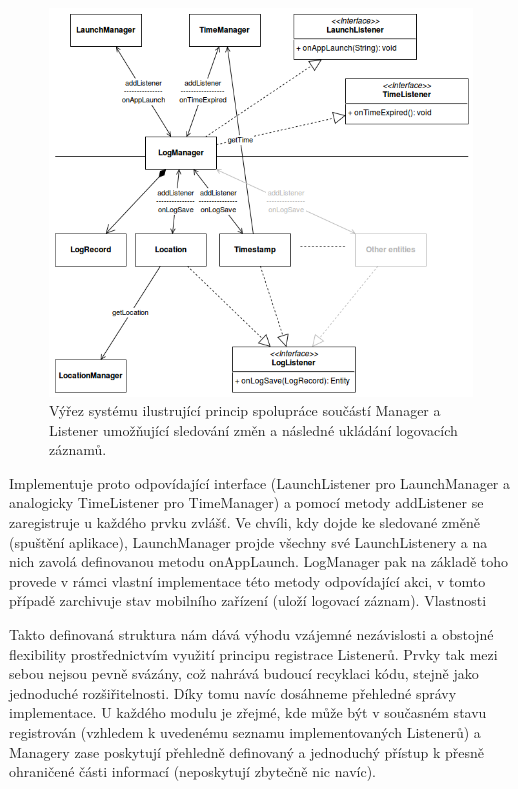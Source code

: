 \documentclass[thesis=M,czech]{FITthesis}[2012/06/26]
\begin{document}
\begin{figure}\centering
	\includegraphics[width=1\textwidth]{figures/manager_listener}
	\caption{Výřez systému ilustrující princip spolupráce součástí Manager a Listener umožňující sledování změn a následné ukládání logovacích záznamů.}
	\label{fig:manager_listener}
\end{figure}

Implementuje proto odpovídající interface (LaunchListener pro LaunchManager a analogicky TimeListener pro TimeManager) a pomocí metody addListener se zaregistruje u každého prvku zvlášť. Ve chvíli, kdy dojde ke sledované změně (spuštění aplikace), LaunchManager projde všechny své LaunchListenery a na nich zavolá definovanou metodu onAppLaunch. LogManager pak na základě toho provede v rámci vlastní implementace této metody odpovídající akci, v tomto případě zarchivuje stav mobilního zařízení (uloží logovací záznam).
Vlastnosti

Takto definovaná struktura nám dává výhodu vzájemné nezávislosti a obstojné flexibility prostřednictvím využití principu registrace Listenerů. Prvky tak mezi sebou nejsou pevně svázány, což nahrává budoucí recyklaci kódu, stejně jako jednoduché rozšiřitelnosti. Díky tomu navíc dosáhneme přehledné správy implementace. U každého modulu je zřejmé, kde může být v současném stavu registrován (vzhledem k uvedenému seznamu implementovaných Listenerů) a Managery zase poskytují přehledně definovaný a jednoduchý přístup k přesně ohraničené části informací (neposkytují zbytečně nic navíc).
\end{document}

